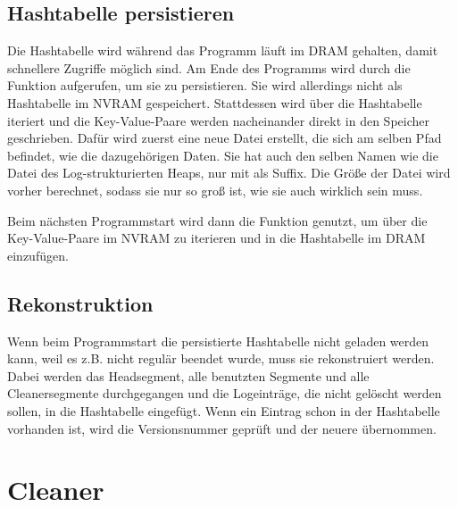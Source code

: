 \documentclass{class/thesis}
\begin{document}
\begin{thesis}
	
	\subsection{Hashtabelle persistieren}
	
	Die Hashtabelle wird während das Programm läuft im DRAM gehalten, damit schnellere Zugriffe möglich sind.
	Am Ende des Programms wird durch  die Funktion  aufgerufen, um sie zu persistieren. Sie wird allerdings nicht als Hashtabelle im NVRAM gespeichert. Stattdessen wird über die Hashtabelle iteriert und die Key-Value-Paare werden nacheinander direkt in den Speicher geschrieben.
	Dafür wird zuerst eine neue Datei erstellt, die sich am selben Pfad befindet, wie die dazugehörigen Daten. Sie hat auch den selben Namen wie die Datei des Log-strukturierten Heaps, nur mit  als Suffix.
	Die Größe der Datei wird vorher berechnet, sodass sie nur so groß ist, wie sie auch wirklich sein muss.
	
	Beim nächsten Programmstart wird dann die Funktion  genutzt, um über die Key-Value-Paare im NVRAM zu iterieren und in die Hashtabelle im DRAM einzufügen.
	
	
	\subsection{Rekonstruktion} \label{hashRekonstruktion}
	
	Wenn beim Programmstart die persistierte Hashtabelle nicht geladen werden kann, weil es z.B. nicht regulär beendet wurde, muss sie rekonstruiert werden.
	Dabei werden das Headsegment, alle benutzten Segmente und alle Cleanersegmente durchgegangen und die Logeinträge, die nicht gelöscht werden sollen, in die Hashtabelle eingefügt. 
	Wenn ein Eintrag schon in der Hashtabelle vorhanden ist, wird die Versionsnummer geprüft und der neuere übernommen.
	
	
	
	\section{Cleaner} \label{cleaner}
	

\end{thesis}
\end{document}
